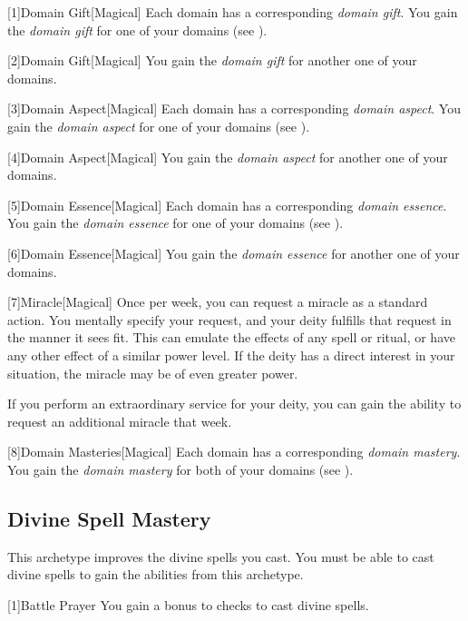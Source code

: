         [1]{Domain Gift}[Magical]
        Each domain has a corresponding \textit{domain gift}.
        You gain the \textit{domain gift} for one of your domains (see ).

        [2]{Domain Gift}[Magical]
        You gain the \textit{domain gift} for another one of your domains.

        [3]{Domain Aspect}[Magical]
        Each domain has a corresponding \textit{domain aspect}.
        You gain the \textit{domain aspect} for one of your domains (see ).

        [4]{Domain Aspect}[Magical]
        You gain the \textit{domain aspect} for another one of your domains.

        [5]{Domain Essence}[Magical]
        Each domain has a corresponding \textit{domain essence}.
        You gain the \textit{domain essence} for one of your domains (see ).

        [6]{Domain Essence}[Magical]
        You gain the \textit{domain essence} for another one of your domains.

        [7]{Miracle}[Magical]
        Once per week, you can request a miracle as a standard action.
        You mentally specify your request, and your deity fulfills that request in the manner it sees fit.
        This can emulate the effects of any spell or ritual, or have any other effect of a similar power level.
        If the deity has a direct interest in your situation, the miracle may be of even greater power.

        If you perform an extraordinary service for your deity, you can gain the ability to request an additional miracle that week.

        [8]{Domain Masteries}[Magical]
        Each domain has a corresponding \textit{domain mastery}.
        You gain the \textit{domain mastery} for both of your domains (see ).

    \subsection{Divine Spell Mastery}
        This archetype improves the divine spells you cast.
        You must be able to cast divine spells to gain the abilities from this archetype.

        [1]{Battle Prayer} You gain a  bonus to  checks to cast divine spells.

